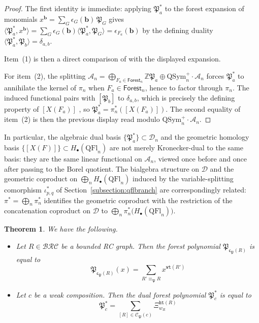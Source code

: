 \documentclass[a4paper,fleqn]{cas-sc}
\newtheorem{theorem}{Theorem}[section]
\theoremstyle{definition}
\theoremstyle{remark}
\numberwithin{equation}{subsection}
\newcommand{\wof}[1]{w_{#1}}
\newcommand{\wtt}{\mathtt{wt}}
\newcommand{\hr}{\mathtt{ht}}
\newcommand{\BRC}{\mathcal{BRC}}
\newcommand{\dsch}{\ensuremath{\Xi}}
\newcommand{\coma}{\mathcal{A}}
\newcommand{\dcoma}{\mathcal{D}}
\newcommand{\forest}{\mathfrak{P}}
\newcommand{\fcode}{\mathfrak{c}_\forest}
\begin{document}
\begin{proof}
The first identity is immediate: applying $\forest_a^*$ to the forest expansion of monomials $x^{\mathbf{b}}=\sum_G \epsilon_G(\mathbf{b})\,\forest_G$ \cite[Proposition~10.15]{nadeau2024quasisymmetric} gives $\langle \forest_a^*, x^{\mathbf{b}}\rangle = \sum_G \epsilon_G(\mathbf{b})\langle \forest_a^*,\forest_G\rangle = \epsilon_{F_a}(\mathbf{b})$ by the defining duality $\langle \forest_a^*,\forest_b\rangle=\delta_{a,b}$.

Item~(1) is then a direct comparison of \cite[Proposition~10.14]{nadeau2024quasisymmetric} with the displayed expansion.

For item~(2), the splitting $\coma_n = \bigoplus_{F_a\in\mathsf{Forest}_n}\mathbb{Z}\forest_a \oplus \mathrm{QSym}_n^+\cdot\coma_n$ \cite[Theorem~9.7]{nadeau2024quasisymmetric} forces $\forest_a^*$ to annihilate the kernel of $\pi_n$ when $F_a\in\mathsf{Forest}_n$, hence to factor through $\pi_n$. The induced functional pairs with $[\forest_b]$ to $\delta_{a,b}$, which is precisely the defining property of $[X(F_a)]$ \cite[Theorem~12.12]{bergeron2025qsymflag}, so $\forest_a^*=\pi_n^*([X(F_a)])$. The second equality of item~(2) is then the previous display read modulo $\mathrm{QSym}_n^+\cdot\coma_n$.
\end{proof}

In particular, the algebraic dual basis $\{\forest_a^*\}\subset\dcoma_n$ and the geometric homology basis $\{[X(F)]\}\subset H_\bullet(\mathrm{QFl}_n)$ are not merely Kronecker-dual to the same basis: they are the same linear functional on $\coma_n$, viewed once before and once after passing to the Borel quotient. The bialgebra structure on $\dcoma$ and the geometric coproduct on $\bigoplus_n H_\bullet(\mathrm{QFl}_n)$ induced by the variable-splitting comorphism $\iota_{p,q}^*$ of Section~\ref{subsection:qflbranch} are correspondingly related: $\pi^* = \bigoplus_n \pi_n^*$ identifies the geometric coproduct with the restriction of the concatenation coproduct on $\dcoma$ to $\bigoplus_n \pi_n^*\!\bigl(H_\bullet(\mathrm{QFl}_n)\bigr)$.


\begin{theorem}\label{theorem:forestformula}
  We have the following.
  \begin{itemize}
\item[I] Let $R\in \BRC$ be a bounded RC graph. Then the forest polynomial $\forest_{\fcode(R)}$ is equal to
$$\forest_{\fcode(R)}(x)=\sum_{R'\equiv_{\forest} R} x^{\wtt(R')}$$

\item[II] Let $c$ be a weak composition. Then the dual forest polynomial $\forest^*_c$ is equal to
$$\forest^*_c = \sum_{[R]\in\mathcal{C}_\forest(c)} \dsch_{\wof{R}}^{\hr(R)}$$
  \end{itemize}
\end{theorem}
\end{document}
